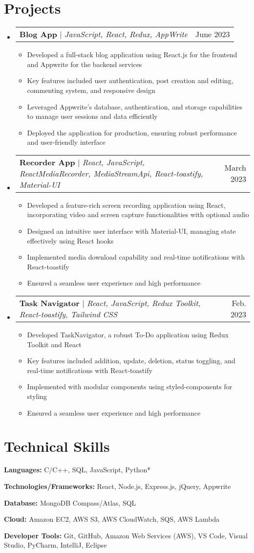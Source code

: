 \documentclass[letterpaper,11pt]{article}
\makeatletter
\newcommand{\resumeItem}[1]{\item\small{#1 \vspace{-2pt}}}
\newcommand{\resumeProjectHeading}[2]{\item\begin{tabular*}{0.97\textwidth}{l@{\extracolsep{\fill}}r}\small#1 & #2 \\ \end{tabular*}\vspace{-7pt}}
\newcommand{\resumeSubHeadingListStart}{\begin{itemize}[leftmargin=0.15in, label={}]}
\newcommand{\resumeSubHeadingListEnd}{\end{itemize}}
\newcommand{\resumeItemListStart}{\begin{itemize}}
\newcommand{\resumeItemListEnd}{\end{itemize}\vspace{-5pt}}
\makeatother
\begin{document}
\section{Projects}
\resumeSubHeadingListStart
    \resumeProjectHeading
      {\textbf{Blog App} $|$ \emph{JavaScript, React, Redux, AppWrite}}{June 2023}
      \resumeItemListStart
        \resumeItem{Developed a full-stack blog application using React.js for the frontend and Appwrite for the backend services}
        \resumeItem{Key features included user authentication, post creation and editing, commenting system, and responsive design}
        \resumeItem{Leveraged Appwrite's database, authentication, and storage capabilities to manage user sessions and data efficiently}
        \resumeItem{Deployed the application for production, ensuring robust performance and user-friendly interface}
      \resumeItemListEnd
    \resumeProjectHeading
      {\textbf{Recorder App} $|$ \emph{React, JavaScript, ReactMediaRecorder, MediaStreamApi, React-toastify, Material-UI}}{March 2023}
      \resumeItemListStart
        \resumeItem{Developed a feature-rich screen recording application using React, incorporating video and screen capture functionalities with optional audio}
        \resumeItem{Designed an intuitive user interface with Material-UI, managing state effectively using React hooks}
        \resumeItem{Implemented media download capability and real-time notifications with React-toastify}
        \resumeItem{Ensured a seamless user experience and high performance}
      \resumeItemListEnd
    \resumeProjectHeading
      {\textbf{Task Navigator} $|$ \emph{React, JavaScript, Redux Toolkit, React-toastify, Tailwind CSS}}{Feb. 2023}
      \resumeItemListStart
        \resumeItem{Developed TaskNavigator, a robust To-Do application using Redux Toolkit and React}
        \resumeItem{Key features included addition, update, deletion, status toggling, and real-time notifications with React-toastify}
        \resumeItem{Implemented with modular components using styled-components for styling}
        \resumeItem{Ensured a seamless user experience and high performance}
      \resumeItemListEnd
\resumeSubHeadingListEnd

\section{Technical Skills}
\begin{itemize}[leftmargin=0.15in, label={}]
    \small{
        \item \textbf{Languages:} C/C++, SQL, JavaScript, Python*
        \item \textbf{Technologies/Frameworks:} React, Node.js, Express.js, jQuery, Appwrite
        \item \textbf{Database:} MongoDB Compass/Atlas, SQL
        \item \textbf{Cloud:} Amazon EC2, AWS S3, AWS CloudWatch, SQS, AWS Lambda
        \item \textbf{Developer Tools:} Git, GitHub, Amazon Web Services (AWS), VS Code, Visual Studio, PyCharm, IntelliJ, Eclipse
    }
\end{itemize}
\end{document}
